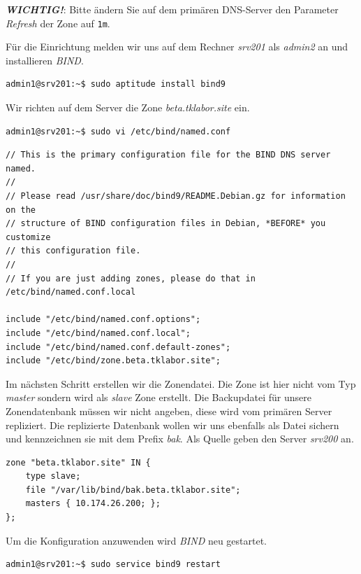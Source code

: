 \textbf{\textit{WICHTIG!}}: Bitte ändern Sie auf dem primären DNS-Server den
Parameter \textit{Refresh} der Zone auf \texttt{1m}. 

Für die Einrichtung melden wir uns auf dem Rechner \textit{srv201} als
\textit{admin2} an und installieren \textit{BIND}.

\begin{lstlisting}
admin1@srv201:~$ sudo aptitude install bind9
\end{lstlisting}

Wir richten auf dem Server die Zone \textit{beta.tklabor.site} ein.
\begin{lstlisting}
admin1@srv201:~$ sudo vi /etc/bind/named.conf
\end{lstlisting}
\begin{scriptsize}
\begin{lstlisting}
// This is the primary configuration file for the BIND DNS server named.
//
// Please read /usr/share/doc/bind9/README.Debian.gz for information on the 
// structure of BIND configuration files in Debian, *BEFORE* you customize 
// this configuration file.
//
// If you are just adding zones, please do that in /etc/bind/named.conf.local

include "/etc/bind/named.conf.options";
include "/etc/bind/named.conf.local";
include "/etc/bind/named.conf.default-zones";
include "/etc/bind/zone.beta.tklabor.site";
\end{lstlisting}
\end{scriptsize}

Im nächsten Schritt erstellen wir die Zonendatei. Die Zone ist hier nicht vom
Typ \textit{master} sondern wird als \textit{slave} Zone erstellt. Die
Backupdatei für unsere Zonendatenbank müssen wir nicht angeben, diese wird vom
primären Server repliziert. Die replizierte Datenbank wollen wir uns ebenfalls
als Datei sichern und kennzeichnen sie mit dem Prefix \textit{bak}. Als Quelle
geben den Server \textit{srv200} an.

\begin{scriptsize}
\begin{lstlisting}
zone "beta.tklabor.site" IN {
	type slave;
	file "/var/lib/bind/bak.beta.tklabor.site";
	masters { 10.174.26.200; };
};
\end{lstlisting}
\end{scriptsize}

Um die Konfiguration anzuwenden wird \textit{BIND} neu gestartet.
\begin{lstlisting}
admin1@srv201:~$ sudo service bind9 restart
\end{lstlisting}

